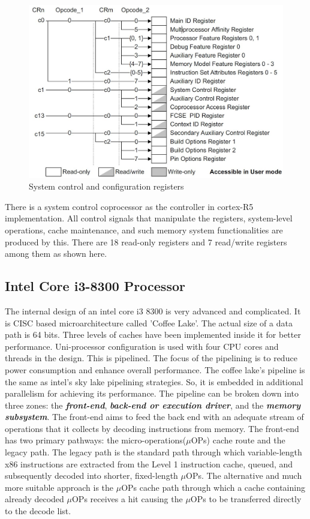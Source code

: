 \documentclass[a4paper,11pt]{article}
\begin{document}
\begin{figure}[!h]
	\centering
	\includegraphics[scale= 0.3]{figures/syscc}
	\caption{System control and configuration registers}
\end{figure}

There is a system control coprocessor as the controller in cortex-R5 implementation. All control signals that manipulate the registers, system-level operations, cache maintenance, and such memory system functionalities are produced by this. There are 18 read-only registers and 7 read/write registers among them as shown here.


\subsection{Intel Core i3-8300 Processor}
The internal design of an intel core i3 8300 is very advanced and complicated. It is CISC based microarchitecture called 'Coffee Lake'.  The actual size of a data path is 64 bits. Three levels of caches have been implemented inside it for better performance. Uni-processor configuration is used with four CPU cores and threads in the design. This is pipelined. The focus of the pipelining is to reduce power consumption and enhance overall performance. The coffee lake's pipeline is the same as intel's sky lake pipelining strategies. So, it is embedded in additional parallelism for achieving its performance. The pipeline can be broken down into three zones: the \textbf{\textit{front-end}}, \textit{\textbf{back-end or execution driver}}, and the \textbf{\textit{memory subsystem}}. The front-end aims to feed the back end with an adequate stream of operations that it collects by decoding instructions from memory. The front-end has two primary pathways: the micro-operations($\mu$OPs) cache route and the legacy path. The legacy path is the standard path through which variable-length x86 instructions are extracted from the Level 1 instruction cache, queued, and subsequently decoded into shorter, fixed-length $\mu$OPs. The alternative and much more suitable approach is the $\mu$OPs cache path through which a cache containing already decoded $\mu$OPs receives a hit causing the $\mu$OPs to be transferred directly to the decode list.\\
\end{document}
